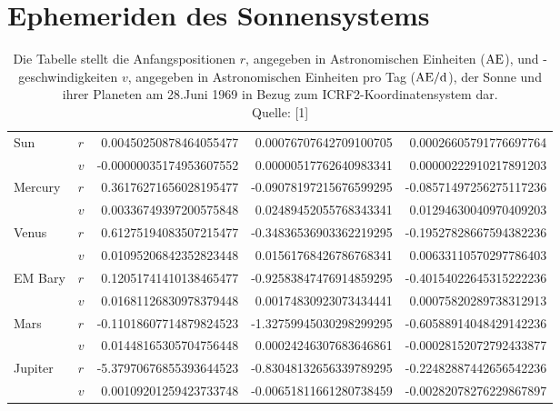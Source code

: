\section{Ephemeriden des Sonnensystems} %
\label{sec:ephemeriden_des_sonnensystem}

  \begin{table}[h]
    \caption{Die Tabelle stellt die Anfangspositionen $r$, angegeben in Astronomischen Einheiten ($\mathrm{AE}$), und -geschwindigkeiten $v$, angegeben in Astronomischen Einheiten pro Tag ($\mathrm{AE}/\mathrm{d}$), der Sonne und ihrer Planeten am 28.Juni 1969 in Bezug zum ICRF2-Koordinatensystem dar. \\ Quelle: [1]}
    \center
    \renewcommand{\arraystretch}{1.5}
    \scriptsize
    \begin{tabular}{llrrr}
      \hline
      \hline
      \multirow{2}{*}{Sun}
      & $r$ & 0.00450250878464055477 & 0.00076707642709100705 & 0.00026605791776697764 \\
      & $v$ & -0.00000035174953607552 & 0.00000517762640983341 & 0.00000222910217891203 \\
      \hline
      \multirow{2}{*}{Mercury}
      & $r$ & 0.36176271656028195477 & -0.09078197215676599295 & -0.08571497256275117236 \\
      & $v$ & 0.00336749397200575848 & 0.02489452055768343341 & 0.01294630040970409203 \\
      \hline
      \multirow{2}{*}{Venus}
      & $r$ & 0.61275194083507215477 & -0.34836536903362219295 & -0.19527828667594382236 \\
      & $v$ & 0.01095206842352823448 & 0.01561768426786768341 & 0.00633110570297786403 \\
      \hline
      \multirow{2}{*}{EM Bary}
      & $r$ & 0.12051741410138465477 & -0.92583847476914859295 & -0.40154022645315222236 \\
      & $v$ & 0.01681126830978379448 & 0.00174830923073434441 & 0.00075820289738312913 \\
      \hline
      \multirow{2}{*}{Mars}
      & $r$ & -0.11018607714879824523 & -1.32759945030298299295 & -0.60588914048429142236 \\
      & $v$ & 0.01448165305704756448 & 0.00024246307683646861 & -0.00028152072792433877 \\
      \hline
      \multirow{2}{*}{Jupiter}
      & $r$ & -5.37970676855393644523 & -0.83048132656339789295 & -0.22482887442656542236 \\
      & $v$ & 0.00109201259423733748 & -0.00651811661280738459 & -0.00282078276229867897 \\

\end{tabular}
\end{table}
